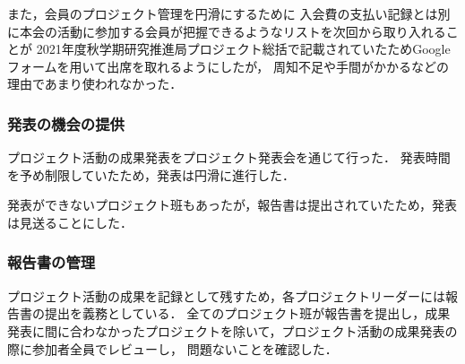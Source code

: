 また，会員のプロジェクト管理を円滑にするために
入会費の支払い記録とは別に本会の活動に参加する会員が把握できるようなリストを次回から取り入れることが
2021年度秋学期研究推進局プロジェクト総括で記載されていたためGoogleフォームを用いて出席を取れるようにしたが，
周知不足や手間がかかるなどの理由であまり使われなかった．

\subsubsection*{発表の機会の提供}

プロジェクト活動の成果発表をプロジェクト発表会を通じて行った．
発表時間を予め制限していたため，発表は円滑に進行した．

発表ができないプロジェクト班もあったが，報告書は提出されていたため，発表は見送ることにした．

\subsubsection*{報告書の管理}

プロジェクト活動の成果を記録として残すため，各プロジェクトリーダーには報告書の提出を義務としている．
全てのプロジェクト班が報告書を提出し，成果発表に間に合わなかったプロジェクトを除いて，プロジェクト活動の成果発表の際に参加者全員でレビューし，
問題ないことを確認した．
